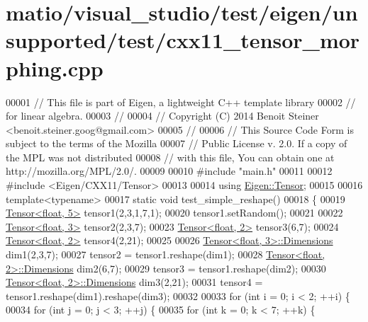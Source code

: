 \hypertarget{matio_2visual__studio_2test_2eigen_2unsupported_2test_2cxx11__tensor__morphing_8cpp_source}{}\section{matio/visual\+\_\+studio/test/eigen/unsupported/test/cxx11\+\_\+tensor\+\_\+morphing.cpp}
\label{matio_2visual__studio_2test_2eigen_2unsupported_2test_2cxx11__tensor__morphing_8cpp_source}

\begin{DoxyCode}
00001 \textcolor{comment}{// This file is part of Eigen, a lightweight C++ template library}
00002 \textcolor{comment}{// for linear algebra.}
00003 \textcolor{comment}{//}
00004 \textcolor{comment}{// Copyright (C) 2014 Benoit Steiner <benoit.steiner.goog@gmail.com>}
00005 \textcolor{comment}{//}
00006 \textcolor{comment}{// This Source Code Form is subject to the terms of the Mozilla}
00007 \textcolor{comment}{// Public License v. 2.0. If a copy of the MPL was not distributed}
00008 \textcolor{comment}{// with this file, You can obtain one at http://mozilla.org/MPL/2.0/.}
00009 
00010 \textcolor{preprocessor}{#include "main.h"}
00011 
00012 \textcolor{preprocessor}{#include <Eigen/CXX11/Tensor>}
00013 
00014 \textcolor{keyword}{using} \hyperlink{class_eigen_1_1_tensor}{Eigen::Tensor};
00015 
00016 \textcolor{keyword}{template}<\textcolor{keyword}{typename}>
00017 \textcolor{keyword}{static} \textcolor{keywordtype}{void} test\_simple\_reshape()
00018 \{
00019   \hyperlink{class_eigen_1_1_tensor}{Tensor<float, 5>} tensor1(2,3,1,7,1);
00020   tensor1.setRandom();
00021 
00022   \hyperlink{class_eigen_1_1_tensor}{Tensor<float, 3>} tensor2(2,3,7);
00023   \hyperlink{class_eigen_1_1_tensor}{Tensor<float, 2>} tensor3(6,7);
00024   \hyperlink{class_eigen_1_1_tensor}{Tensor<float, 2>} tensor4(2,21);
00025 
00026   \hyperlink{class_eigen_1_1_tensor}{Tensor<float, 3>::Dimensions} dim1(2,3,7);
00027   tensor2 = tensor1.reshape(dim1);
00028   \hyperlink{class_eigen_1_1_tensor}{Tensor<float, 2>::Dimensions} dim2(6,7);
00029   tensor3 = tensor1.reshape(dim2);
00030   \hyperlink{class_eigen_1_1_tensor}{Tensor<float, 2>::Dimensions} dim3(2,21);
00031   tensor4 = tensor1.reshape(dim1).reshape(dim3);
00032 
00033   \textcolor{keywordflow}{for} (\textcolor{keywordtype}{int} i = 0; i < 2; ++i) \{
00034     \textcolor{keywordflow}{for} (\textcolor{keywordtype}{int} j = 0; j < 3; ++j) \{
00035       \textcolor{keywordflow}{for} (\textcolor{keywordtype}{int} k = 0; k < 7; ++k) \{

\end{DoxyCode}

